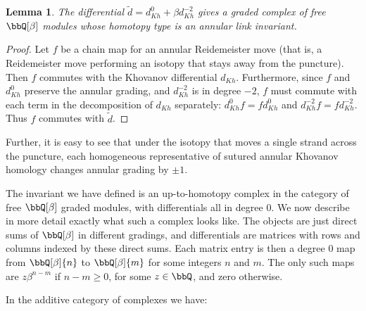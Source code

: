 \documentclass{amsart}
\theoremstyle{plain}
\newtheorem{lem}[prop]{Lemma}
\begin{document}
\begin{lem}
The differential $\tilde{d}=d_{Kh}^0 + \beta d_{Kh}^{-2}$ gives a graded complex of free $\bbQ[\beta]$ modules whose homotopy type is an annular link invariant.
\end{lem}

\begin{proof}
Let $f$ be a chain map for an annular Reidemeister move (that is, a Reidemeister move performing an isotopy that stays away from the puncture).  Then $f$ commutes with the Khovanov differential $d_{Kh}$.  Furthermore, since $f$ and $d_{Kh}^0$ preserve the annular grading, and $d_{Kh}^{-2}$ is in degree $-2$, $f$ must commute with each term in the decomposition of $d_{Kh}$ separately: $d_{Kh}^0 f= f d_{Kh}^0$ and $d_{Kh}^{-2} f = f d_{Kh}^{-2}$.  Thus $f$ commutes with $\tilde{d}$.
\end{proof}

Further, it is easy to see that under the isotopy that moves a single strand across the puncture, each homogeneous representative of sutured annular Khovanov homology changes annular grading by $\pm 1$.

The invariant we have defined is an up-to-homotopy complex in the category of free $\bbQ[\beta]$ graded modules, with differentials all in degree 0. We now describe in more detail exactly what such a complex looks like.
The objects are just direct sums of $\bbQ[\beta]$ in different gradings, and differentials are matrices with rows and columns indexed by these direct sums. Each matrix entry is then a degree 0 map from $\bbQ[\beta]\{n\}$ to $\bbQ[\beta]\{m\}$ for some integers $n$ and $m$. The only such maps are $z \beta^{n-m}$ if $n-m \geq 0$, for some $z \in \bbQ$, and zero otherwise.

In the additive category of complexes we have:
\end{document}
